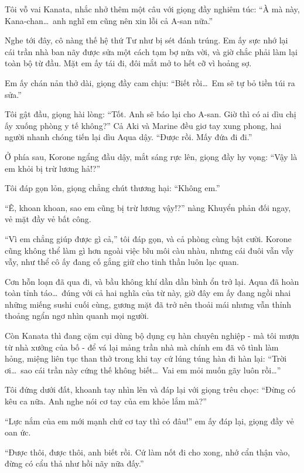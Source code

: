 \documentclass[../main.tex]{subfiles}
\begin{document}
Tôi vỗ vai Kanata, nhắc nhở thêm một câu với giọng đầy nghiêm túc: ``À mà này, Kana-chan\dots\ anh nghĩ em cũng nên xin lỗi cả A-san nữa.''

Nghe tới đây, cô nàng thế hệ thứ Tư như bị sét đánh trúng. Em ấy sực nhớ lại cái trần nhà ban nãy được sửa một cách tạm bợ nửa vời, và giờ chắc phải làm lại toàn bộ từ đầu. Mặt em ấy tái đi, đôi mắt mở to hết cỡ vì hoảng sợ.

Em ấy chán nản thở dài, giọng đầy cam chịu: ``Biết rồi\dots\ Em sẽ tự bỏ tiền túi ra sửa.''

Tôi gật đầu, giọng hài lòng: ``Tốt. Anh sẽ báo lại cho A-san. Giờ thì có ai dìu chị ấy xuống phòng y tế không?'' Cả Aki và Marine đều giơ tay xung phong, hai người nhanh chóng tiến lại dìu Aqua dậy. ``Được rồi. Mấy đứa đi đi.''

Ở phía sau, Korone ngẩng đầu dậy, mắt sáng rực lên, giọng đầy hy vọng: ``Vậy là em khỏi bị trừ lương hả!?''

Tôi đáp gọn lỏn, giọng chẳng chút thương hại: ``Không em.''

``Ê, khoan khoan, sao em cũng bị trừ lương vậy!?'' nàng Khuyển phản đối ngay, vẻ mặt đầy vẻ bất công.

``Vì em chẳng giúp được gì cả,'' tôi đáp gọn, và cả phòng cùng bật cười. Korone cũng không thể làm gì hơn ngoài việc bĩu môi càu nhàu, nhưng cái đuôi vẫn vẫy vẫy, như thể cô ấy đang cố gắng giữ cho tinh thần luôn lạc quan.

\ct

Cơn hỗn loạn đã qua đi, và bầu không khí dần dần bình ổn trở lại. Aqua đã hoàn toàn tỉnh táo\dots\ đúng với cả hai nghĩa của từ này, giờ đây em ấy đang ngồi nhai những miếng sushi cuối cùng, gương mặt đã trở nên thoải mái nhưng vẫn thỉnh thoảng ngẩn ngơ nhìn quanh mọi người.

Còn Kanata thì đang cặm cụi dùng bộ dụng cụ hàn chuyên nghiệp - mà tôi mượn từ nhà xưởng của bố - để vá lại mảng trần nhà mà chính em đã vô tình làm hỏng, miệng liên tục than thở trong khi tay cứ lúng túng hàn đi hàn lại: ``Trời ơi\dots\ sao cái trần này cứng thế không biết\dots\ Vai em mỏi muốn gãy luôn rồi\dots''

Tôi đứng dưới đất, khoanh tay nhìn lên và đáp lại với giọng trêu chọc: ``Đừng có kêu ca nữa. Anh nghe nói cơ tay của em khỏe lắm mà?''

``Lực nắm của em mới mạnh chứ cơ tay thì có đâu!'' em ấy đáp lại, giọng đầy vẻ oan ức.

``Được thôi, được thôi, anh biết rồi. Cứ làm nốt đi cho xong, nhớ cẩn thận vào, đừng có cẩu thả như hồi nãy nữa đấy.''
\end{document}
